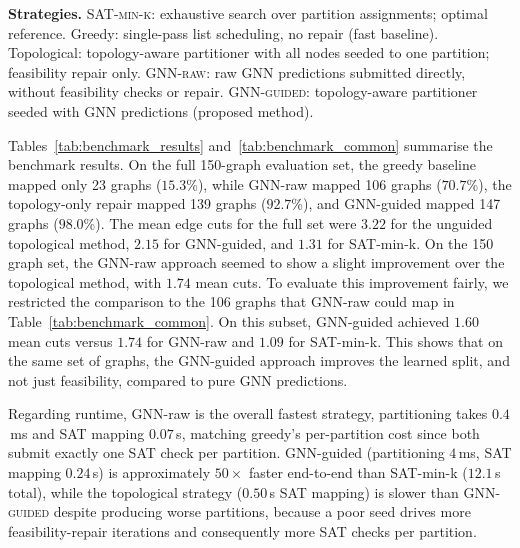 \begin{table}[!t]
\vspace{1ex}
\begin{minipage}{\linewidth}
\scriptsize
\textbf{Strategies.}
\textsc{SAT-min-k}: exhaustive search over partition assignments; optimal reference. Greedy: single-pass list scheduling, no repair (fast baseline). Topological: topology-aware partitioner with all nodes seeded to one partition; feasibility repair only.
\textsc{GNN-raw}: raw GNN predictions submitted directly, without feasibility checks or repair.
\textsc{GNN-guided}: topology-aware partitioner seeded with GNN predictions (proposed method).
\end{minipage}
\end{table}

Tables~\ref{tab:benchmark_results} and~\ref{tab:benchmark_common} summarise the benchmark results. On the full 150-graph evaluation set, the greedy baseline mapped only 23 graphs ($15.3$\%), while GNN-raw mapped 106 graphs ($70.7$\%), the topology-only repair mapped 139 graphs ($92.7$\%), and GNN-guided mapped 147 graphs ($98.0$\%). The mean edge cuts for the full set were $3.22$ for the unguided topological method, $2.15$ for GNN-guided, and $1.31$ for SAT-min-k. On the 150 graph set, the GNN-raw approach seemed to show a slight improvement over the topological method, with $1.74$ mean cuts. To evaluate this improvement fairly, we restricted the comparison to the 106 graphs that GNN-raw could map in Table~\ref{tab:benchmark_common}. On this subset, GNN-guided achieved $1.60$ mean cuts versus $1.74$ for GNN-raw and $1.09$ for SAT-min-k. This shows that on the same set of graphs, the GNN-guided approach improves the learned split, and not just feasibility, compared to pure GNN predictions.

Regarding runtime, GNN-raw is the overall fastest strategy, partitioning takes $0.4$\,ms and SAT mapping $0.07$\,s, matching greedy's per-partition cost since both submit exactly one SAT check per partition. GNN-guided (partitioning $4$\,ms, SAT mapping $0.24$\,s) is approximately $50\times$ faster end-to-end than SAT-min-k ($12.1$\,s total), while the topological strategy ($0.50$\,s SAT mapping) is slower than \textsc{GNN-guided} despite producing worse partitions, because a poor seed drives more feasibility-repair iterations and consequently more SAT checks per partition.

